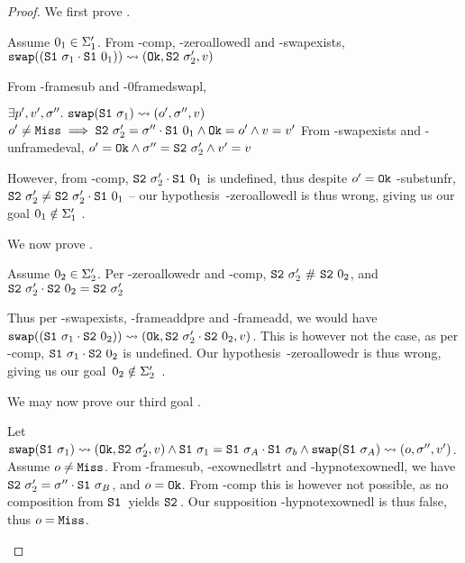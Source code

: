 \begin{proof}
We first prove .

\begin{hypvlist}
	 Assume $0_1\in \Sigma_1'$.
	 From \hyp{comp}, \hyp{zeroallowedl} and \hyp{swapexists}, $\texttt{swap}((\texttt{S1}~\sigma_1\cdot\texttt{S1}~0_1))\rightsquigarrow(\texttt{Ok},\texttt{S2}~\sigma_2',v)$
\end{hypvlist}

From \hyp{framesub} and \hyp{0framedswapl},
\begin{hypvlist}
	 $\exists p',v',\sigma''.~\texttt{swap}(\texttt{S1}~\sigma_1)\rightsquigarrow(o',\sigma'',v)$
	 $o'\neq\texttt{Miss}\implies \texttt{S2}~\sigma_2'=\sigma''\cdot\texttt{S1}~0_1 \land \texttt{Ok}=o' \land v=v'$
	 From \hyp{swapexists} and \hyp{unframedeval}, $o'=\texttt{Ok} \land \sigma''=\texttt{S2}~\sigma_2' \land v'=v$
\end{hypvlist}

However, from \hyp{comp}, $\texttt{S2}~\sigma_2'\cdot\texttt{S1}~0_1$ is undefined, thus despite $o'=\texttt{Ok}$ \hyp{substunfr}, $\texttt{S2}~\sigma_2'\neq\texttt{S2}~\sigma_2'\cdot\texttt{S1}~0_1$ -- our hypothesis~\hyp{zeroallowedl} is thus wrong, giving us our goal $0_1\notin \Sigma_1'$ .


We now prove .

\begin{hypvlist}
	 Assume $0_2\in \Sigma_2'$.
	 Per \hyp{zeroallowedr} and \hyp{comp}, $\texttt{S2}~\sigma_2'~\#~\texttt{S2}~0_2$, and $\texttt{S2}~\sigma_2'\cdot\texttt{S2}~0_2=\texttt{S2}~\sigma_2'$
\end{hypvlist}

Thus per \hyp{swapexists}, \hyp{frameaddpre} and \hyp{frameadd}, we would have $\texttt{swap}((\texttt{S1}~\sigma_1\cdot\texttt{S2}~0_2))\rightsquigarrow(\texttt{Ok},\texttt{S2}~\sigma_2'\cdot\texttt{S2}~0_2,v)$. This is however not the case, as per \hyp{comp}, $\texttt{S1}~\sigma_1\cdot\texttt{S2}~0_2$ is undefined. Our hypothesis~\hyp{zeroallowedr} is thus wrong, giving us our goal~$0_2\notin\Sigma_2'$~.



We may now prove our third goal .

\begin{hypvlist}
	 Let $\texttt{swap}(\texttt{S1}~\sigma_1)\rightsquigarrow(\texttt{Ok},\texttt{S2}~\sigma_2',v) \land \texttt{S1}~\sigma_1=\texttt{S1}~\sigma_A\cdot\texttt{S1}~\sigma_b \land \texttt{swap}(\texttt{S1}~\sigma_A)\rightsquigarrow(o,\sigma'',v')$.
	 Assume $o\neq\texttt{Miss}$.
	 From \hyp{framesub}, \hyp{exownedlstrt} and \hyp{hypnotexownedl}, we have $\texttt{S2}~\sigma_2'=\sigma''\cdot\texttt{S1}~\sigma_B$, and $o=\texttt{Ok}$. From \hyp{comp} this is however not possible, as no composition from $\texttt{S1}~\!$ yields $\texttt{S2}~\!$. Our supposition \hyp{hypnotexownedl} is thus false, thus $o=\texttt{Miss}$.
\end{hypvlist}



\end{proof}
